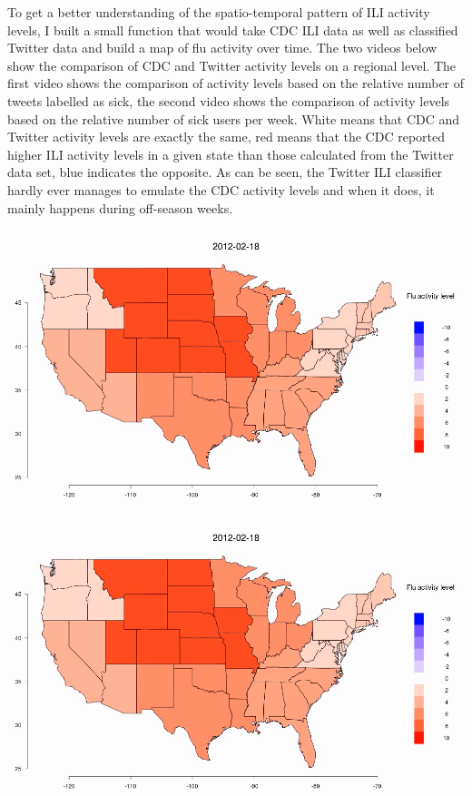 \documentclass[11pt, a4paper]{article}\usepackage[]{graphicx}\usepackage[]{color}
\begin{document}
To get a better understanding of the spatio-temporal pattern of ILI activity levels, I built a small function that would take CDC ILI data as well as classified Twitter data and build a map of flu activity over time. The two videos below show the comparison of CDC and Twitter activity levels on a regional level. The first video shows the comparison of activity levels based on the relative number of tweets labelled as sick, the second video shows the comparison of activity levels based on the relative number of sick users per week. White means that CDC and Twitter activity levels are exactly the same, red means that the CDC reported higher ILI activity levels in a given state than those calculated from the Twitter data set, blue indicates the opposite. As can be seen, the Twitter ILI classifier hardly ever manages to emulate the CDC activity levels and when it does, it mainly happens during off-season weeks.\newline

\centering \href{run:vids/regional_Twitter_cdc_diff_full_rel_sick.avi}{\includegraphics[scale=0.5]{vids/Screenshot_Movie.png}} 

\bigskip

\centering \href{run:vids/regional_Twitter_cdc_diff_full_rel_sick_user.avi}{\includegraphics[scale=0.5]{vids/Screenshot_Movie.png}} 
\end{document}

